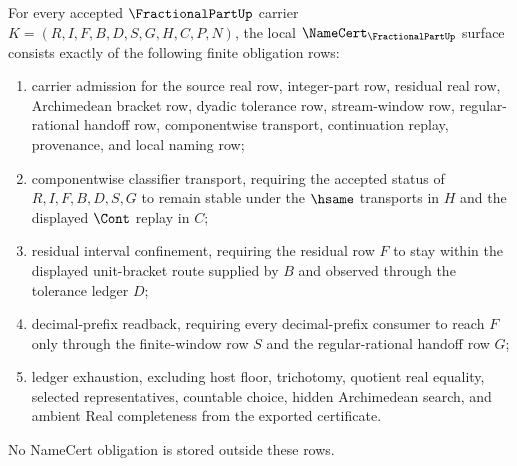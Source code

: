 \begin{theorem}
\label{thm:fractional-part-namecert-obligations}
For every accepted $\FractionalPartUp$ carrier $K=(R,I,F,B,D,S,G,H,C,P,N)$, the local $\NameCert_{\FractionalPartUp}$ surface consists exactly of the following finite obligation rows:
\begin{enumerate}
\item carrier admission for the source real row, integer-part row, residual real row, Archimedean bracket row, dyadic tolerance row, stream-window row, regular-rational handoff row, componentwise transport, continuation replay, provenance, and local naming row;
\item componentwise classifier transport, requiring the accepted status of $R,I,F,B,D,S,G$ to remain stable under the $\hsame$ transports in $H$ and the displayed $\Cont$ replay in $C$;
\item residual interval confinement, requiring the residual row $F$ to stay within the displayed unit-bracket route supplied by $B$ and observed through the tolerance ledger $D$;
\item decimal-prefix readback, requiring every decimal-prefix consumer to reach $F$ only through the finite-window row $S$ and the regular-rational handoff row $G$;
\item ledger exhaustion, excluding host floor, trichotomy, quotient real equality, selected representatives, countable choice, hidden Archimedean search, and ambient Real completeness from the exported certificate.
\end{enumerate}
No NameCert obligation is stored outside these rows.
\end{theorem}

